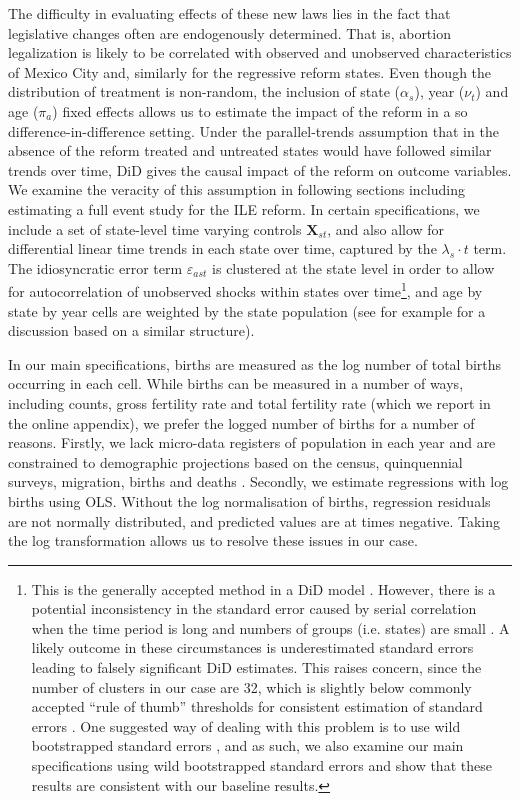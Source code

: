 \documentclass[a4paper,11pt]{article}
\begin{document}
\begin{spacing}{1.5}
The difficulty in evaluating effects of these new laws lies in the fact that legislative changes often are endogenously determined.  That is, abortion legalization is likely to be correlated with observed and unobserved characteristics of Mexico City and, similarly for the regressive reform states.  Even though the distribution of treatment is non-random, the inclusion of state ($\alpha_s$), year ($\nu_t$) and age ($\pi_a$) fixed effects allows us to estimate the impact of the reform in a so difference-in-difference setting.  Under the parallel-trends assumption that in the absence of the reform treated and untreated states would have followed similar trends over time, DiD gives the causal impact of the reform on outcome variables.  We examine the veracity of this assumption in following sections including estimating a full event study for the ILE reform.  In certain specifications, we include a set of state-level time varying controls $\bm{X}_{st}$, and also allow for differential linear time trends in each state over time, captured by the $\lambda_{s}\cdot t$ term.  The idiosyncratic error term $\varepsilon_{ast}$ is clustered at the state level in order to allow for autocorrelation of unobserved shocks within states over time\footnote{This is the generally accepted method in a DiD model \citep{Bertrandetal2004}.  However, there is a potential inconsistency in the standard error caused by serial correlation when the time period is long and numbers of groups (i.e. states) are small \citep{Bertrandetal2004}.  A likely outcome in these circumstances is underestimated standard errors leading to falsely significant DiD estimates.  This raises concern, since the number of clusters in our case are 32, which is slightly below commonly accepted ``rule of thumb'' thresholds for consistent estimation of standard errors \citep{angrist_mostly_2009,CameronMiller2015}. One suggested way of dealing with this problem is to use wild bootstrapped standard errors \citep{Bertrandetal2004,CameronMiller2015}, and as such, we also examine our main specifications using wild bootstrapped standard errors and show that these results are consistent with our baseline results.}, and age by state by year cells are weighted by the state population (see for example \citet{Dell2015} for a discussion based on a similar structure).

In our main specifications, births are measured as the log number of total births occurring in each cell.  While births can be measured in a number of ways, including counts, gross fertility rate and total fertility rate (which we report in the online appendix), we prefer the logged number of births for a number of reasons.  Firstly, we lack micro-data registers of population in each year and are constrained to demographic projections based on the census, quinquennial surveys, migration, births and deaths \citep{CONAPO2012}.  Secondly, we estimate regressions with log births using OLS.  Without the log normalisation of births, regression residuals are not normally distributed, and predicted values are at times negative.  Taking the log transformation allows us to resolve these issues in our case.


\end{spacing}
\end{document}

